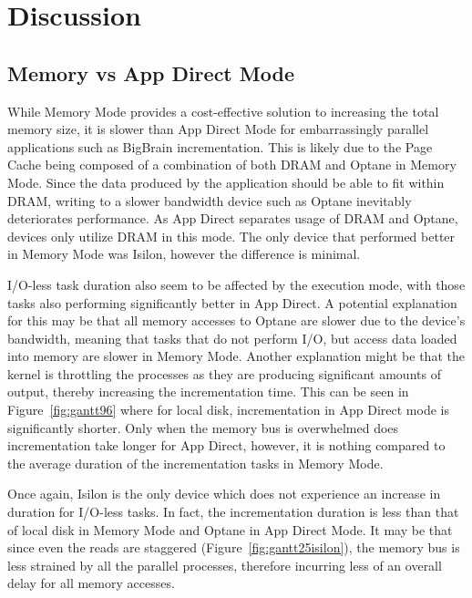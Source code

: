 \documentclass[conference]{IEEEtran}
\newcommand{\bigbrain}{BigBrain }
\begin{document}
\section{Discussion}
\subsection{Memory vs App Direct Mode}

While Memory Mode provides a cost-effective solution to increasing the total memory
size, it is slower than App Direct Mode for embarrassingly parallel applications such
as \bigbrain incrementation. This is likely due to the Page Cache being composed of a
combination of both DRAM and Optane in Memory Mode. Since the data produced by the application should be
able to fit within DRAM, writing to a slower bandwidth device such as Optane inevitably
deteriorates performance. As App Direct separates usage of DRAM and Optane, devices only utilize DRAM in this mode.
The only device that performed better in Memory Mode was 
Isilon, however the difference is minimal.

I/O-less task duration also seem to be affected by the execution mode, with those tasks
also performing significantly better in App Direct. A potential explanation for this may be 
that all memory accesses to Optane are slower due to the device's bandwidth, meaning that
tasks that do not perform I/O, but access data loaded into memory are slower in Memory Mode. Another explanation might be that the kernel is throttling the processes
as they are producing significant amounts of output, thereby increasing the
incrementation time.
This can be seen in Figure~\ref{fig:gantt96} where for local disk, incrementation in App Direct
mode is significantly shorter. Only when the memory bus is overwhelmed does incrementation take
longer for App Direct, however, it is nothing compared to the average duration of the incrementation
tasks in Memory Mode. 

Once again, Isilon is the only device which does not experience an increase in duration for
I/O-less tasks. In fact, the incrementation duration is less than that of local disk in Memory Mode
and Optane in App Direct Mode. It may be that since even the reads are staggered
(Figure~\ref{fig:gantt25isilon}), the memory bus is less strained by all the parallel processes,
therefore incurring less of an overall delay for all memory accesses.
\end{document}
